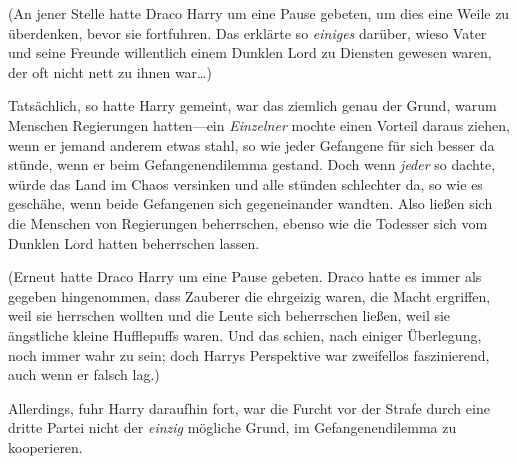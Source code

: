 (An jener Stelle hatte Draco Harry um eine Pause gebeten, um dies eine Weile zu überdenken, bevor sie fortfuhren. Das erklärte so \emph{einiges} darüber, wieso Vater und seine Freunde willentlich einem Dunklen Lord zu Diensten gewesen waren, der oft nicht nett zu ihnen war…)

Tatsächlich, so hatte Harry gemeint, war das ziemlich genau der Grund, warum Menschen Regierungen hatten—ein \emph{Einzelner} mochte einen Vorteil daraus ziehen, wenn er jemand anderem etwas stahl, so wie jeder Gefangene für sich besser da stünde, wenn er beim Gefangenendilemma gestand. Doch wenn \emph{jeder} so dachte, würde das Land im Chaos versinken und alle stünden schlechter da, so wie es geschähe, wenn beide Gefangenen sich gegeneinander wandten. Also ließen sich die Menschen von Regierungen beherrschen, ebenso wie die Todesser sich vom Dunklen Lord hatten beherrschen lassen.

(Erneut hatte Draco Harry um eine Pause gebeten. Draco hatte es immer als gegeben hingenommen, dass Zauberer die ehrgeizig waren, die Macht ergriffen, weil sie herrschen wollten und die Leute sich beherrschen ließen, weil sie ängstliche kleine Hufflepuffs waren. Und das schien, nach einiger Überlegung, noch immer wahr zu sein; doch Harrys Perspektive war zweifellos faszinierend, auch wenn er falsch lag.)

Allerdings, fuhr Harry daraufhin fort, war die Furcht vor der Strafe durch eine dritte Partei nicht der \emph{einzig} mögliche Grund, im Gefangenendilemma zu kooperieren.

